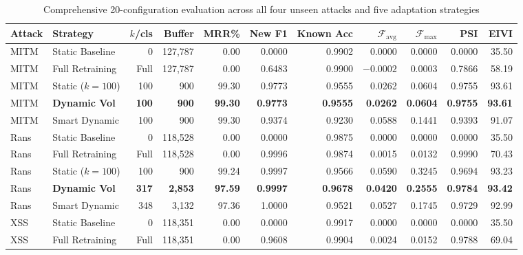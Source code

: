 \begin{table}[htbp]
\centering
\scriptsize
\setlength{\tabcolsep}{3pt}
\renewcommand{\arraystretch}{1.2}
\caption{Comprehensive 20-configuration evaluation across all four unseen attacks and five adaptation strategies}
\label{tab:phase10_complete_20rows}
\begin{tabular}{|l|l|r|r|r|r|r|r|r|r|r|}
\hline
\textbf{Attack} & \textbf{Strategy} & \textbf{$k$/cls} & \textbf{Buffer} & \textbf{MRR\%} & \textbf{New F1} & \textbf{Known Acc} & $\mathcal{F}_{\text{avg}}$ & $\mathcal{F}_{\max}$ & \textbf{PSI} & \textbf{EIVI} \\ \hline
MITM & Static Baseline      & 0    & 127{,}787 & 0.00  & 0.0000 & 0.9902 & 0.0000  & 0.0000 & 0.0000 & 35.50 \\
MITM & Full Retraining      & Full & 127{,}787 & 0.00  & 0.6483 & 0.9900 & $-0.0002$ & 0.0003 & 0.7866 & 58.19 \\
MITM & Static ($k=100$)     & 100  & 900       & 99.30 & 0.9773 & 0.9555 & 0.0262  & 0.0604 & 0.9755 & 93.61 \\
MITM & \textbf{Dynamic Vol} & \textbf{100} & \textbf{900} & \textbf{99.30} & \textbf{0.9773} & \textbf{0.9555} & \textbf{0.0262} & \textbf{0.0604} & \textbf{0.9755} & \textbf{93.61} \\
MITM & Smart Dynamic        & 100  & 900       & 99.30 & 0.9374 & 0.9230 & 0.0588  & 0.1441 & 0.9393 & 91.07 \\ \hline
Rans & Static Baseline      & 0    & 118{,}528 & 0.00  & 0.0000 & 0.9875 & 0.0000  & 0.0000 & 0.0000 & 35.50 \\
Rans & Full Retraining      & Full & 118{,}528 & 0.00  & 0.9996 & 0.9874 & 0.0015  & 0.0132 & 0.9990 & 70.43 \\
Rans & Static ($k=100$)     & 100  & 900       & 99.24 & 0.9997 & 0.9566 & 0.0590  & 0.3245 & 0.9694 & 93.23 \\
Rans & \textbf{Dynamic Vol} & \textbf{317} & \textbf{2{,}853} & \textbf{97.59} & \textbf{0.9997} & \textbf{0.9678} & \textbf{0.0420} & \textbf{0.2555} & \textbf{0.9784} & \textbf{93.42} \\
Rans & Smart Dynamic        & 348  & 3{,}132   & 97.36 & 1.0000 & 0.9521 & 0.0527  & 0.1745 & 0.9729 & 92.99 \\ \hline
XSS  & Static Baseline      & 0    & 118{,}351 & 0.00  & 0.0000 & 0.9917 & 0.0000  & 0.0000 & 0.0000 & 35.50 \\
XSS  & Full Retraining      & Full & 118{,}351 & 0.00  & 0.9608 & 0.9904 & 0.0024  & 0.0152 & 0.9788 & 69.04 \\

\end{tabular}
\end{table}
